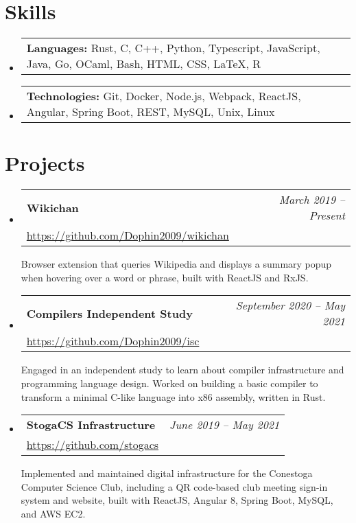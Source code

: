 \documentclass[letterpaper,11pt]{article}
\makeatletter
\newcommand{\resumeSubheading}[4]{
  \vspace{-2pt}\item
    \begin{tabular*}{0.97\textwidth}[t]{l@{\extracolsep{\fill}}r}
      \textbf{#1} & #2 \\
      {#3} & \textit{\small #4} \\[3pt]
    \end{tabular*}\vspace{-5pt}
}
\newcommand{\resumeSubheadingDescription}[1]{
  \parbox{0.97\textwidth}{#1}
}
\newcommand{\resumeSubSubSubheading}[2]{
  \vspace{3pt}
  \item \begin{tabular*}{0.97\textwidth}{l}
      \textbf{#1:} #2 \\
    \end{tabular*}\vspace{-8pt}
}
\newenvironment{resumeSubHeadingList}{
  \begin{itemize}[leftmargin=*, label={}]
}{
  \end{itemize}
}
\makeatother
\begin{document}
\section{Skills}
  \vspace*{-5pt}

  \begin{resumeSubHeadingList}
    \resumeSubSubSubheading{Languages}%
      {Rust, C, C++, Python, Typescript, JavaScript, Java, Go, OCaml, Bash, HTML, CSS, LaTeX, R}
    \resumeSubSubSubheading{Technologies}%
      {Git, Docker, Node.js, Webpack, ReactJS, Angular, Spring Boot, REST, MySQL, Unix, Linux}
  \end{resumeSubHeadingList}

  \vspace*{0pt}
\vspace*{-2pt}
\section{Projects}

  \begin{resumeSubHeadingList}
    \resumeSubheading%
      {Wikichan}%
      {\small\itshape March 2019 -- Present}%
      {\small \url{https://github.com/Dophin2009/wikichan}}%
      {}

      \resumeSubheadingDescription{
        Browser extension that queries Wikipedia and displays a summary popup when hovering over a
        word or phrase, built with ReactJS and RxJS.
      }

    \resumeSubheading%
      {Compilers Independent Study}%
      {\small\itshape September 2020 -- May 2021}%
      {\small \url{https://github.com/Dophin2009/isc}}%
      {}

      \resumeSubheadingDescription{
        Engaged in an independent study to learn about compiler infrastructure and programming
        language design. Worked on building a basic compiler to transform a minimal C-like language
        into x86 assembly, written in Rust.
      }

    \resumeSubheading%
      {StogaCS Infrastructure}%
      {\small\itshape June 2019 -- May 2021}%
      {\small \url{https://github.com/stogacs}}%
      {}

      \resumeSubheadingDescription{
        Implemented and maintained digital infrastructure for the Conestoga Computer Science Club,
        including a QR code-based club meeting sign-in system and website, built with ReactJS,
        Angular 8, Spring Boot, MySQL, and AWS EC2.
      }
  \end{resumeSubHeadingList}
\end{document}
